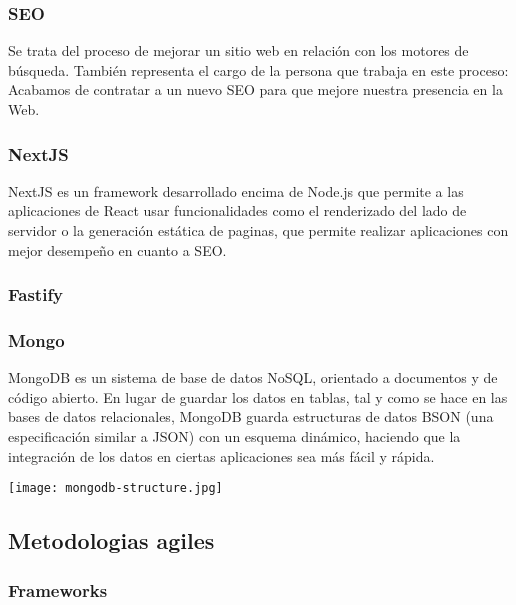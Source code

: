     \subsubsection{SEO}
    
        Se trata del proceso de mejorar un sitio web en relación con los motores de búsqueda. También representa el cargo de la persona que trabaja en este proceso: Acabamos de contratar a un nuevo SEO para que mejore nuestra presencia en la Web.

    \subsubsection{NextJS}
        NextJS es un framework desarrollado encima de Node.js que permite a las aplicaciones de React usar funcionalidades como el renderizado del lado de servidor o la generación estática de paginas, que permite realizar aplicaciones con mejor desempeño en cuanto a SEO.


    \subsubsection{Fastify}

    \subsubsection{Mongo}

        MongoDB es un sistema de base de datos NoSQL, orientado a documentos y de código abierto. En lugar de guardar los datos en tablas, tal y como se hace en las bases de datos relacionales, MongoDB guarda estructuras de datos BSON (una especificación similar a JSON) con un esquema dinámico, haciendo que la integración de los datos en ciertas aplicaciones sea más fácil y rápida.

        \texttt{[image: mongodb-structure.jpg]}


\subsection{Metodologias agiles}


    \subsubsection{Frameworks}

